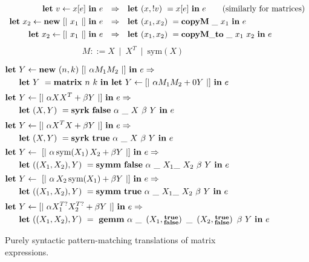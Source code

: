 \begin{figure}[t]
\begin{center}
\[\def\arraystretch{1.3}
    \begin{array}{rcl}
    \Let\ v \leftarrow x[e]\ \In\ e &
    \Rightarrow &
    \Let\ (x, !v)\ = x[e]\ \In\ e \qquad \textrm{(similarly for matrices)}
\\
    \Let\ x_2 \leftarrow \ottkw{new}\ [|\ x_1\ |]\ \In\ e &
    \Rightarrow &
    \Let\ (x_1, x_2)\ = \ottkw{copyM}\ \_\ x_1\ \In\ e
\\
    \Let\ x_2 \leftarrow [|\ x_1\ |]\ \In\ e &
    \Rightarrow &
    \Let\ (x_1, x_2)\ = \ottkw{copyM\_to}\ \_\ x_1\ x_2\ \In\ e
    \end{array}
\]
\[
    M ::= X\ \mid\ X^T\ \mid\ \textrm{sym}( X )
\]
\end{center}
\begin{align*}
    \mathbf{let}\ &Y \leftarrow \mathbf{new}\ (n, k)\ [|\ \alpha M_1 M_2 \ |]\ \mathbf{in}\ e
    \Rightarrow \\
    & \mathbf{let}\ Y\ = \mathbf{matrix}\ n\ k\ \mathbf{in}
    \ \mathbf{let}\ Y \leftarrow [|\ \alpha M_1 M_2 + 0Y\ |]\ \mathbf{in}\ e
\\[0.1\baselineskip]
    \mathbf{let}\ &Y \leftarrow [|\ \alpha X X^T + \beta Y\ |]\ \mathbf{in}\ e
    \Rightarrow \\
    & \mathbf{let}\ (X,Y)\ = \mathbf{syrk}\ \mathbf{false}
    \ \alpha\ \_\ X\ \beta\ Y\ \mathbf{in}\ e
\\[0.1\baselineskip]
    \mathbf{let}\ &Y \leftarrow [|\ \alpha X^T X + \beta Y\ |]\ \mathbf{in}\ e
    \Rightarrow \\
    & \mathbf{let}\ (X,Y)\ = \mathbf{syrk}\ \mathbf{true}
    \ \alpha\ \_\ X\ \beta\ Y\ \mathbf{in}\ e
\\[0.1\baselineskip]
    \mathbf{let}\ &Y \leftarrow\ [|\ \alpha\,\textrm{sym}(X_1)\,X_2 + \beta Y\ |]\ \mathbf{in}\ e
    \Rightarrow \\
    & \mathbf{let}\ ((X_1,X_2),Y)\ = \mathbf{symm}\ \mathbf{false}
        \ \alpha\ \_ \ X_1 \_\ X_2\ \beta\ Y\ \mathbf{in}\ e
\\[0.1\baselineskip]
    \mathbf{let}\ &Y \leftarrow\ [|\ \alpha\,X_2\,\textrm{sym}(X_1) + \beta Y\ |]\ \mathbf{in}\ e
    \Rightarrow \\
    & \mathbf{let}\ ((X_1,X_2),Y)\ = \mathbf{symm}\ \mathbf{true}
        \ \alpha\ \_ \ X_1 \_\ X_2\ \beta\ Y\ \mathbf{in}\ e
\\[0.1\baselineskip]
    \mathbf{let}\ &Y \leftarrow [|\ \alpha X_1^{T?} X_2^{T?} + \beta Y\ |]\ \mathbf{in}\ e
    \Rightarrow \\
    & \mathbf{let}\ ((X_1,X_2),Y)\ =\ \mathbf{gemm}\ \alpha
        \ \_\ \left(X_1, \substack{\mathbf{true}\\\mathbf{false}}\right)
        \ \_\ \left(X_2, \substack{\mathbf{true}\\\mathbf{false}}\right)
        \ \beta\ Y\ \mathbf{in}\ e
\end{align*}

\caption{Purely syntactic pattern-matching translations of
    matrix expressions.}\label{fig:lang_matexp}
\end{figure}

